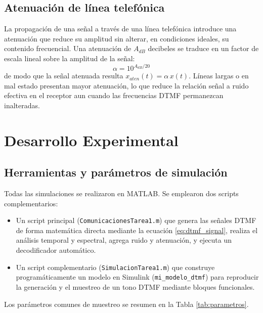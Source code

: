 \documentclass[conference]{IEEEtran}
\begin{document}
\subsection{Atenuación de línea telefónica}

La propagación de una señal a través de una línea telefónica introduce una atenuación que reduce su amplitud sin alterar, en condiciones ideales, su contenido frecuencial. Una atenuación de $A_{dB}$ decibeles se traduce en un factor de escala lineal sobre la amplitud de la señal:
\begin{equation}
\alpha = 10^{A_{dB}/20}
\label{eq:atenuacion}
\end{equation}
de modo que la señal atenuada resulta $x_{aten}(t) = \alpha \, x(t)$. Líneas largas o en mal estado presentan mayor atenuación, lo que reduce la relación señal a ruido efectiva en el receptor aun cuando las frecuencias DTMF permanezcan inalteradas.

\section{Desarrollo Experimental}

\subsection{Herramientas y parámetros de simulación}

Todas las simulaciones se realizaron en MATLAB. Se emplearon dos scripts complementarios:

\begin{itemize}
    \item Un script principal (\texttt{ComunicacionesTarea1.m}) que genera las señales DTMF de forma matemática directa mediante la ecuación \eqref{eq:dtmf_signal}, realiza el análisis temporal y espectral, agrega ruido y atenuación, y ejecuta un decodificador automático.
    \item Un script complementario (\texttt{SimulacionTarea1.m}) que construye programáticamente un modelo en Simulink (\texttt{mi\_modelo\_dtmf}) para reproducir la generación y el muestreo de un tono DTMF mediante bloques funcionales.
\end{itemize}

Los parámetros comunes de muestreo se resumen en la Tabla \ref{tab:parametros}.
\end{document}
